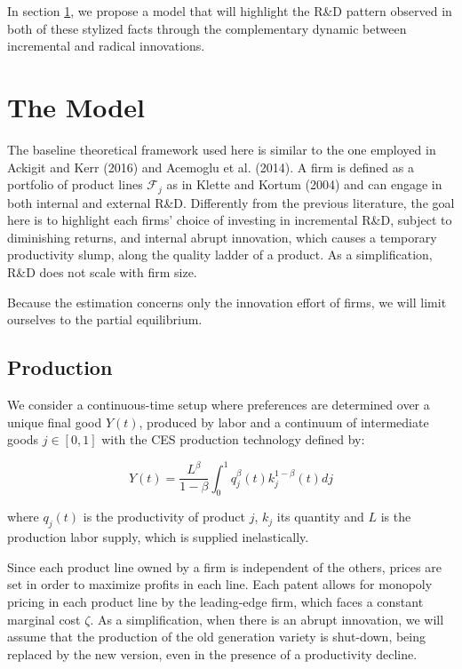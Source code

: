 \documentclass[letterpaper,12pt]{article}
\theoremstyle{definition}
\begin{document}
In section \ref{sec:Model}, we propose a model that will highlight the R\&D pattern observed in both of these stylized facts through the complementary dynamic between incremental and radical innovations.

\section{The Model} \label{sec:Model}

The baseline theoretical framework used here is similar to the one employed in Ackigit and Kerr (2016) and Acemoglu et al. (2014). A firm is defined as a portfolio of product lines $\mathscr{F}_j$ as in Klette and Kortum (2004) and can engage in both internal and external R\&D. Differently from the previous literature, the goal here is to highlight each firms' choice of investing in incremental R\&D, subject to diminishing returns, and internal abrupt innovation, which causes a temporary productivity slump, along the quality ladder of a product. As a simplification, R\&D does not scale with firm size.

Because the estimation concerns only the innovation effort of firms, we will limit ourselves to the partial equilibrium.

\subsection{Production}

We consider a continuous-time setup where preferences are determined over a unique final good $Y(t)$, produced by labor and a continuum of intermediate goods $j \in [0,1]$ with the CES production technology defined by:

\begin{equation} \label{eq:Prod}
Y(t) =  \frac{L^{\beta}}{1 - \beta}\int_0^1 q_j^{\beta}(t)k_j^{1-\beta}(t)dj
\end{equation}

\noindent where $q_j(t)$ is the productivity of product $j$, $k_j$ its quantity and $L$ is the production labor supply, which is supplied inelastically. 

Since each product line owned by a firm is independent of the others, prices are set in order to maximize profits in each line. Each patent allows for monopoly pricing in each product line by the leading-edge firm, which faces a constant marginal cost $\zeta$. As a simplification, when there is an abrupt innovation, we will assume that the production of the old generation variety is shut-down, being replaced by the new version, even in the presence of a productivity decline.
\end{document}
